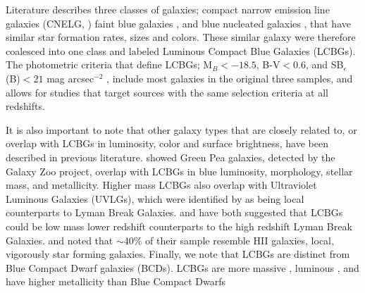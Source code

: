 \documentclass[manuscript]{aastex61}
\begin{document}
Literature describes three classes of galaxies; compact narrow emission line galaxies (CNELG, \citep{1994ApJ...427L...9K,1995ApJ...440L..49K,1996ApJ...460L...5G,1998ApJ...495L..13G}) faint blue galaxies \citep{1997ApJ...489..559G,1997ApJ...489..543P}, and blue nucleated galaxies \citep{1995ApJ...451L...1S,1996ApJ...464...79S}, that have similar star formation rates, sizes and colors. These similar galaxy were therefore coalesced into one class and labeled Luminous Compact Blue Galaxies (LCBGs). The photometric criteria that define LCBGs; M$_{B}<-18.5$, B-V$<$0.6, and SB$_{e}$(B)$<21$ mag arcsec$^{-2}$ \citep{2004ApJ...615..689G}, include most galaxies in the original three samples, and allows for studies that target sources with the same selection criteria at all redshifts.

It is also important to note that other galaxy types that are closely related to, or overlap with LCBGs in luminosity, color and surface brightness, have been described in previous literature. \citet{2009MNRAS.399.1191C} showed Green Pea galaxies, detected by the Galaxy Zoo project, overlap with LCBGs in blue luminosity, morphology, stellar mass, and metallicity. Higher mass LCBGs also overlap with Ultraviolet Luminous Galaxies (UVLGs), which were identified by \citet{2005ApJ...619L..35H} as being local counterparts to Lyman Break Galaxies. \citet{2003ApJ...586L..45G} and \citet{2004AJ....128.1541H} have both suggested that LCBGs could be low mass lower redshift counterparts to the high redshift Lyman Break Galaxies. \citet{1997ApJ...489..543P} and \citet{1997ApJ...489..559G} noted that $\sim$40\% of their sample resemble HII galaxies, local, vigorously star forming galaxies. Finally, we note that LCBGs are distinct from Blue Compact Dwarf galaxies (BCDs). LCBGs are more massive \citep{1997ApJ...489..559G,2004ApJ...615..689G,2010ApJ...708.1076T}, luminous \citep{2004ApJ...615..689G}, and have higher metallicity \citep{2010ApJ...708.1076T} than Blue Compact Dwarfs
\end{document}
